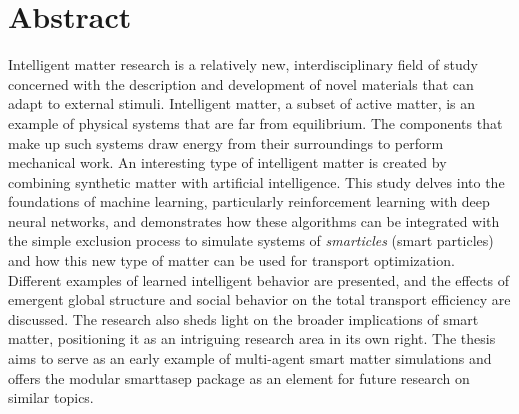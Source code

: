 \chapter*{Abstract}\label{chap:abstract}

Intelligent matter research is a relatively new, interdisciplinary field of study concerned with the description and development of novel materials that can adapt to external stimuli. Intelligent matter, a subset of active matter, is an example of physical systems that are far from equilibrium. The components that make up such systems draw energy from their surroundings to perform mechanical work. An interesting type of intelligent matter is created by combining synthetic matter with artificial intelligence. 
This study delves into the foundations of machine learning, particularly reinforcement learning with deep neural networks, and demonstrates how these algorithms can be integrated with the simple exclusion process to simulate systems of \textit{smarticles} (smart particles) and how this new type of matter can be used for transport optimization. 
Different examples of learned intelligent behavior are presented, and the effects of emergent global structure and social behavior on the total transport efficiency are discussed.
The research also sheds light on the broader implications of smart matter, positioning it as an intriguing research area in its own right. The thesis aims to serve as an early example of multi-agent smart matter simulations and offers the modular smarttasep package as an element for future research on similar topics.